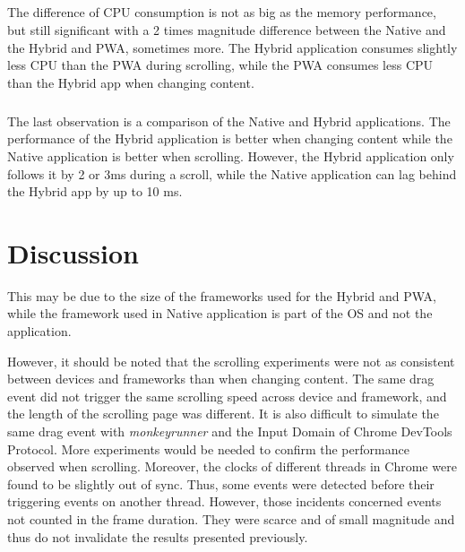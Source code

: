 \paragraph{}
The difference of CPU consumption is not as big as the memory performance, but still significant with a 2 times magnitude difference between the Native and the Hybrid and PWA, sometimes more. The Hybrid application consumes slightly less CPU than the PWA during scrolling, while the PWA consumes less CPU than the Hybrid app when changing content. 

\paragraph{}
The last observation is a comparison of the Native and Hybrid applications. The performance of the Hybrid application is better when changing content while the Native application is better when scrolling. However, the Hybrid application only follows it by 2 or 3ms during a scroll, while the Native application can lag behind the Hybrid app by up to 10 ms. 


\fi
\chapter{Discussion}

This may be due to the size of the frameworks used for the Hybrid and PWA, while the framework used in Native application is part of the OS and not the application.

However, it should be noted that the scrolling experiments were not as consistent between devices and frameworks than when changing content. The same drag event did not trigger the same scrolling speed across device and framework, and the length of the scrolling page was different. It is also difficult to simulate the same drag event with \textit{monkeyrunner} and the Input Domain of Chrome DevTools Protocol. More experiments would be needed to confirm the performance observed when scrolling. Moreover, the clocks of different threads in Chrome were found to be slightly out of sync. Thus, some events were detected before their triggering events on another thread. However, those incidents concerned events not counted in the frame duration. They were scarce and of small magnitude and thus do not invalidate the results presented previously.


